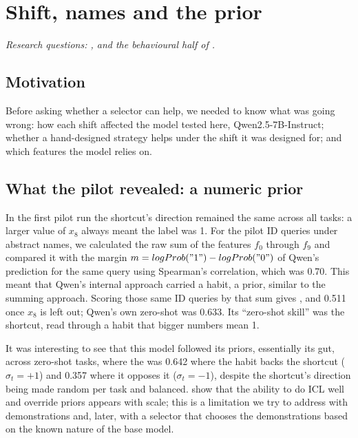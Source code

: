 \chapter{Shift, names and the prior}
\label{ch:shift}

\emph{Research questions: ,  and the behavioural half of .}

\section{Motivation}
Before asking whether a selector can help, we needed to know what was going wrong: how each shift affected the model tested here, Qwen2.5-7B-Instruct; whether a hand-designed strategy helps under the shift it was designed for; and which features the model relies on.

\section{What the pilot revealed: a numeric prior}
\label{sec:shift-p2}
In the first pilot run the shortcut's direction remained the same across all tasks: a larger value of $x_8$ always meant the label was 1. For the pilot ID queries under abstract names, we calculated the raw sum of the features $f_0$ through $f_9$ and compared it with the margin $m = logProb("1") - logProb("0")$ of Qwen's prediction for the same query using Spearman's correlation, which was 0.70. This meant that Qwen's internal approach carried a habit, a prior, similar to the summing approach. Scoring those same ID queries by that sum gives , and 0.511 once $x_8$ is left out; Qwen's own zero-shot \AUROC was 0.633. Its ``zero-shot skill'' was the shortcut, read through a habit that bigger numbers mean 1.


\newpage
It was interesting to see that this model followed its priors, essentially its gut, across zero-shot tasks, where the \AUROC was 0.642 where the habit backs the shortcut ($\sigma_t = +1$) and 0.357 where it opposes it ($\sigma_t = -1$), despite the shortcut's direction being made random per task and balanced. \citet{wei2023larger} show that the ability to do ICL well and override priors appears with scale; this is a limitation we try to address with demonstrations and, later, with a selector that chooses the demonstrations based on the known nature of the base model.

